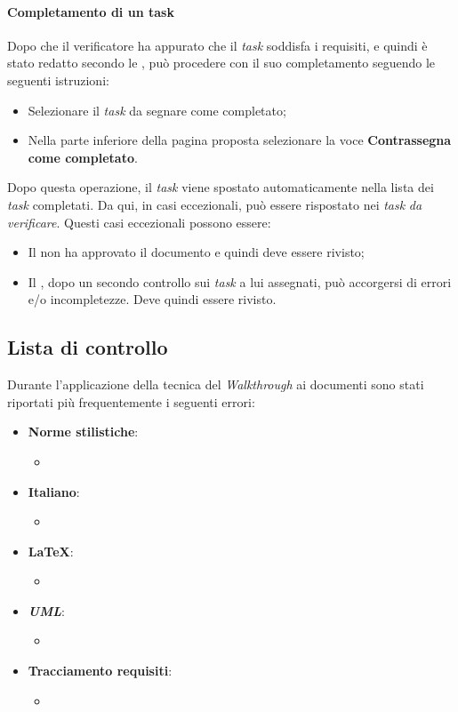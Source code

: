 \paragraph{Completamento di un task}
Dopo che il verificatore ha appurato che il \textit{task} soddisfa i requisiti, e quindi è stato redatto secondo le
\textit{\NdP}, può procedere con il suo completamento seguendo le seguenti istruzioni:
\begin{itemize}
  \item Selezionare il \textit{task} da segnare come completato;
  \item Nella parte inferiore della pagina proposta selezionare la voce \textbf{Contrassegna come completato}.
\end{itemize}
Dopo questa operazione, il \textit{task} viene spostato automaticamente nella lista dei \textit{task} completati. Da qui, in
casi eccezionali, può essere rispostato nei \textit{task} \textit{da verificare}. Questi casi eccezionali possono essere:
\begin{itemize}
  \item Il \textit{\RdP} non ha approvato il documento e quindi deve essere
  rivisto;
  \item Il \textit{\Ver}, dopo un secondo controllo sui \textit{task} a lui assegnati,
  può accorgersi di errori e/o incompletezze. Deve quindi essere rivisto.
\end{itemize}

\subsection{Lista di controllo}
Durante l'applicazione della tecnica del \textit{Walkthrough} ai documenti sono stati riportati
più frequentemente i seguenti errori:
\begin{itemize}
  \item\textbf{Norme stilistiche}:
  \begin{itemize}
    \item
  \end{itemize}

  \item\textbf{Italiano}:
  \begin{itemize}
    \item
  \end{itemize}

  \item\textbf{\LaTeX}:
  \begin{itemize}
  \item
  \end{itemize}

  \item\textbf{\textit{UML}}:
  \begin{itemize}
    \item
  \end{itemize}

  \item\textbf{Tracciamento requisiti}:
  \begin{itemize}
    \item
  \end{itemize}
\end{itemize}
